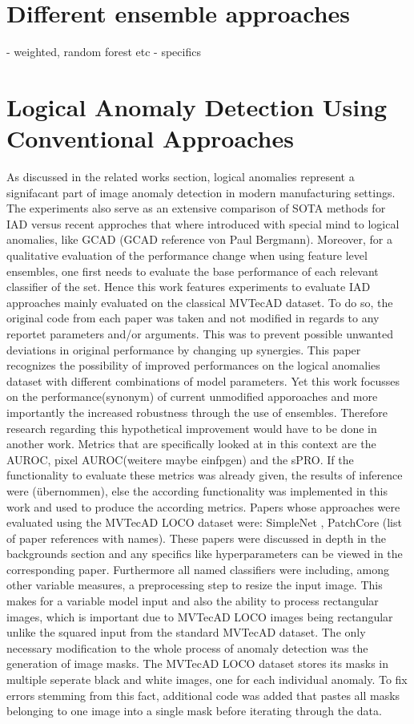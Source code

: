 \section{Different ensemble approaches}
- weighted, random forest etc 
- specifics



\section{Logical Anomaly Detection Using Conventional Approaches}
As discussed in the related works section, logical anomalies represent a signifacant part of image anomaly detection in modern
manufacturing settings. The experiments also serve as an extensive comparison of SOTA methods for IAD versus recent approches that where 
introduced with special mind to logical anomalies, like GCAD \cite{LOCODentsAndScratchesBergmann2022}(GCAD reference von Paul Bergmann). 
Moreover, for a qualitative evaluation of the performance change when using feature level ensembles, one first needs to evaluate the base performance 
of each relevant classifier of the set. 
Hence this work features experiments to evaluate IAD approaches mainly evaluated on the classical MVTecAD dataset. To do so, the original 
code from each paper was taken and not modified in regards to any reportet parameters and/or arguments. This was to prevent possible unwanted deviations 
in original performance by changing up synergies. This paper recognizes the possibility of improved performances on the logical anomalies dataset 
with different combinations of model parameters. Yet this work focusses on the performance(synonym) of current unmodified apporoaches and 
more importantly the increased robustness through the use of ensembles. Therefore research regarding this hypothetical improvement would 
have to be done in another work. Metrics that are specifically looked at in this context are the AUROC, pixel AUROC(weitere maybe einfpgen) and the sPRO. 
If the functionality to evaluate these metrics was already given, the results of inference were (übernommen), else the according functionality 
was implemented in this work and used to produce the according metrics. 
Papers whose approaches were evaluated using the MVTecAD LOCO dataset were: SimpleNet \cite{liu2023simplenet}, PatchCore \cite{patchCore2022} (list of paper references with names). 
These papers were discussed in depth in the backgrounds section and any specifics like 
hyperparameters can be viewed in the corresponding paper. Furthermore all named classifiers were including, among other variable measures, 
a preprocessing step to resize the input image. This makes for a variable model input and also the ability to process rectangular images, 
which is important due to MVTecAD LOCO images being rectangular unlike the squared input from the standard MVTecAD dataset. The only 
necessary modification to the whole process of anomaly detection was the generation of image masks. The MVTecAD LOCO dataset stores its 
masks in multiple seperate black and white images, one for each individual anomaly. To fix errors stemming from this fact, additional 
code was added that pastes all masks belonging to one image into a single mask before iterating through the data.


